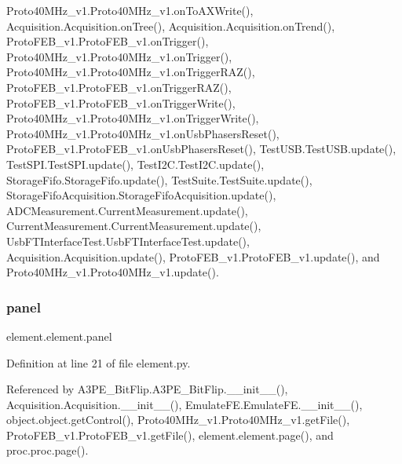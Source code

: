 Proto40\+M\+Hz\+\_\+v1.\+Proto40\+M\+Hz\+\_\+v1.\+on\+To\+A\+X\+Write(), Acquisition.\+Acquisition.\+on\+Tree(), Acquisition.\+Acquisition.\+on\+Trend(), Proto\+F\+E\+B\+\_\+v1.\+Proto\+F\+E\+B\+\_\+v1.\+on\+Trigger(), Proto40\+M\+Hz\+\_\+v1.\+Proto40\+M\+Hz\+\_\+v1.\+on\+Trigger(), Proto40\+M\+Hz\+\_\+v1.\+Proto40\+M\+Hz\+\_\+v1.\+on\+Trigger\+R\+A\+Z(), Proto\+F\+E\+B\+\_\+v1.\+Proto\+F\+E\+B\+\_\+v1.\+on\+Trigger\+R\+A\+Z(), Proto\+F\+E\+B\+\_\+v1.\+Proto\+F\+E\+B\+\_\+v1.\+on\+Trigger\+Write(), Proto40\+M\+Hz\+\_\+v1.\+Proto40\+M\+Hz\+\_\+v1.\+on\+Trigger\+Write(), Proto40\+M\+Hz\+\_\+v1.\+Proto40\+M\+Hz\+\_\+v1.\+on\+Usb\+Phasers\+Reset(), Proto\+F\+E\+B\+\_\+v1.\+Proto\+F\+E\+B\+\_\+v1.\+on\+Usb\+Phasers\+Reset(), Test\+U\+S\+B.\+Test\+U\+S\+B.\+update(), Test\+S\+P\+I.\+Test\+S\+P\+I.\+update(), Test\+I2\+C.\+Test\+I2\+C.\+update(), Storage\+Fifo.\+Storage\+Fifo.\+update(), Test\+Suite.\+Test\+Suite.\+update(), Storage\+Fifo\+Acquisition.\+Storage\+Fifo\+Acquisition.\+update(), A\+D\+C\+Measurement.\+Current\+Measurement.\+update(), Current\+Measurement.\+Current\+Measurement.\+update(), Usb\+F\+T\+Interface\+Test.\+Usb\+F\+T\+Interface\+Test.\+update(), Acquisition.\+Acquisition.\+update(), Proto\+F\+E\+B\+\_\+v1.\+Proto\+F\+E\+B\+\_\+v1.\+update(), and Proto40\+M\+Hz\+\_\+v1.\+Proto40\+M\+Hz\+\_\+v1.\+update().

\mbox{\label{classelement_1_1element_a0fce7cee12f437717c882d0965e46235}} 
\subsubsection{\texorpdfstring{panel}{panel}}
{\footnotesize\ttfamily element.\+element.\+panel}



Definition at line 21 of file element.\+py.



Referenced by A3\+P\+E\+\_\+\+Bit\+Flip.\+A3\+P\+E\+\_\+\+Bit\+Flip.\+\_\+\+\_\+init\+\_\+\+\_\+(), Acquisition.\+Acquisition.\+\_\+\+\_\+init\+\_\+\+\_\+(), Emulate\+F\+E.\+Emulate\+F\+E.\+\_\+\+\_\+init\+\_\+\+\_\+(), object.\+object.\+get\+Control(), Proto40\+M\+Hz\+\_\+v1.\+Proto40\+M\+Hz\+\_\+v1.\+get\+File(), Proto\+F\+E\+B\+\_\+v1.\+Proto\+F\+E\+B\+\_\+v1.\+get\+File(), element.\+element.\+page(), and proc.\+proc.\+page().

\mbox{\label{classobject_1_1object_a2a518f960961d791b0f900a90c3cd287}} 

